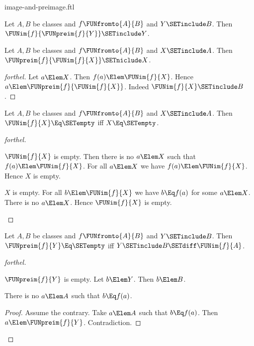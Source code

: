 \documentclass{stex}
\begin{document}
\begin{smodule}{image-and-preimage.ftl}
\begin{corollary}[forthel]
  Let $A, B$ be classes and $f \FUNfromto{A}{B}$ and $Y \SETinclude B$.
  Then $\FUNim{f}{\FUNpreim{f}{Y}} \SETinclude Y$.
\end{corollary}

\begin{proposition}[forthel]
  Let $A, B$ be classes and $f \FUNfromto{A}{B}$ and $X \SETinclude A$.
  Then $\FUNpreim{f}{\FUNim{f}{X}} \SETniclude X$.
\end{proposition}
\begin{proof}[forthel]
  Let $a \Elem X$.
  Then $f(a) \Elem \FUNim{f}{X}$.
  Hence $a \Elem \FUNpreim{f}{\FUNim{f}{X}}$.
  Indeed $\FUNim{f}{X} \SETinclude B$.
\end{proof}

\begin{proposition}[forthel]
  Let $A, B$ be classes and $f \FUNfromto{A}{B}$ and $X \SETinclude A$.
  Then $\FUNim{f}{X} \Eq \SETempty$ iff $X \Eq \SETempty$.
\end{proposition}
\begin{proof}[forthel]
  \begin{case}{$\FUNim{f}{X}$ is empty.}
    Then there is no $a \Elem X$ such that $f(a) \Elem \FUNim{f}{X}$.
    For all $a \Elem X$ we have $f(a) \Elem \FUNim{f}{X}$.
    Hence $X$ is empty.
  \end{case}

  \begin{case}{$X$ is empty.}
    For all $b \Elem \FUNim{f}{X}$ we have $b \Eq f(a)$ for some $a \Elem X$.
    There is no $a \Elem X$.
    Hence $\FUNim{f}{X}$ is empty.
  \end{case}
\end{proof}

\begin{proposition}[forthel]
  Let $A, B$ be classes and $f \FUNfromto{A}{B}$ and $Y \SETinclude B$.
  Then $\FUNpreim{f}{Y} \Eq \SETempty$ iff $Y \SETinclude B \SETdiff \FUNim{f}{A}$.
\end{proposition}
\begin{proof}[forthel]
  \begin{case}{$\FUNpreim{f}{Y}$ is empty.}
    Let $b \Elem Y$.
    Then $b \Elem B$.

    There is no $a \Elem A$ such that $b \Eq f(a)$.
    \begin{proof}
      Assume the contrary.
      Take $a \Elem A$ such that $b \Eq f(a)$.
      Then $a \Elem \FUNpreim{f}{Y}$.
      Contradiction.
    \end{proof}


\end{case}
\end{proof}
\end{smodule}
\end{document}
